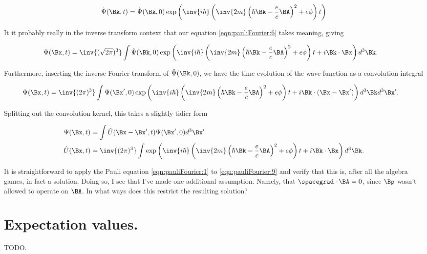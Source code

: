 \begin{align}\label{eqn:pauliFourier:7}
\hat{\Psi}(\Bk, t) = \hat{\Psi}(\Bk, 0) \exp\left(
\inv{i \hbar} \left( \inv{2m} \left( \hbar \Bk - \frac{e}{c} \BA \right)^2 + e \phi \right) t
\right)
\end{align}

It it probably really in the inverse transform context that our equation \ref{eqn:pauliFourier:6} takes meaning, giving

\begin{align}\label{eqn:pauliFourier:8}
\Psi(\Bx, t) &= \inv{(\sqrt{2 \pi})^3} \int 
\hat{\Psi}(\Bk, 0) \exp\left(
\inv{i \hbar} \left( \inv{2m} \left( \hbar \Bk - \frac{e}{c} \BA \right)^2 + e \phi \right) t
+ i \Bk \cdot \Bx
\right)
d^3 \Bk.
\end{align}

Furthermore, inserting the inverse Fourier transform of $\hat{\Psi}(\Bk, 0)$, we have the time evolution of the wave function as a convolution integral

\begin{align}\label{eqn:pauliFourier:9}
\Psi(\Bx, t) &= \inv{(2 \pi)^3} \int 
\Psi(\Bx', 0) \exp\left(
\inv{i \hbar} \left( \inv{2m} \left( \hbar \Bk - \frac{e}{c} \BA \right)^2 + e \phi \right) t
+ i \Bk \cdot (\Bx - \Bx')
\right)
d^3 \Bk d^3 \Bx'.
\end{align}

Splitting out the convolution kernel, this takes a slightly tidier form

\begin{subequations}
\begin{align}\label{eqn:pauliFourier:10}
\Psi(\Bx, t) &= 
\int \hat{U}(\Bx - \Bx', t) \Psi(\Bx', 0) d^3 \Bx' \\
\hat{U}(\Bx, t) &= 
\inv{(2 \pi)^3} 
\int
\exp\left(
\inv{i \hbar} \left( \inv{2m} \left( \hbar \Bk - \frac{e}{c} \BA \right)^2 + e \phi \right) t
+ i \Bk \cdot \Bx 
\right)
d^3 \Bk.
\end{align}
\end{subequations}

It is straightforward to apply the Pauli equation \ref{eqn:pauliFourier:1} to \ref{eqn:pauliFourier:9} and verify that this is, after all the algebra games, in fact a solution.  Doing so, I see that I've made one additional assumption.  Namely, that $\spacegrad \cdot \BA = 0$, since $\Bp$ wasn't allowed to operate on $\BA$.  In what ways does this restrict the resulting solution?

\section{Expectation values.}

TODO.

\EndArticle
